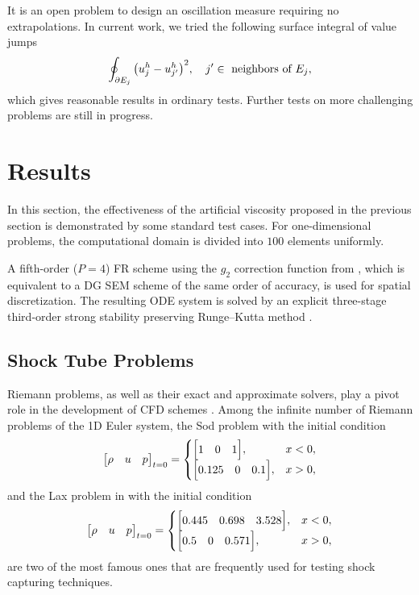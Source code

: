 \documentclass[10pt]{article}
\begin{document}
%
It is an open problem to design an oscillation measure requiring no extrapolations.
%
In current work, we tried the following surface integral of value jumps
$$
\oint_{\partial E_j} \qty(u^h_{j}-u^h_{j'})^2,\quad
j'\in\text{ neighbors of } E_j,
$$
which gives reasonable results in ordinary tests.
%
Further tests on more challenging problems are still in progress.

\section{Results}
In this section, the effectiveness of the artificial viscosity proposed in the previous section is demonstrated by some standard test cases.
%
For one-dimensional problems, the computational domain is divided into $100$ elements uniformly.
%

%
A fifth-order ($P=4$) FR scheme using the $g_2$ correction function from \cite{Huynh_2007}, which is equivalent to a DG SEM scheme of the same order of accuracy, is used for spatial discretization.
%
The resulting ODE system is solved by an explicit three-stage third-order strong stability preserving Runge--Kutta method \cite{Gottlieb_2001}.

\subsection{Shock Tube Problems}
Riemann problems, as well as their exact and approximate solvers, play a pivot role in the development of CFD schemes \cite{Toro_2009}.
Among the infinite number of Riemann problems of the 1D Euler system, the Sod problem with the initial condition
\begin{equation}
\mqty[\rho & u & p]_{t=0}
=
\begin{cases}
\mqty[1 & 0 & 1], &x<0,\\
\mqty[0.125 & 0 & 0.1], &x>0,\\
\end{cases}
\end{equation}
and the Lax problem in with the initial condition
\begin{equation}
\mqty[\rho & u & p]_{t=0}
=
\begin{cases}
\mqty[0.445 & 0.698 & 3.528], &x<0,\\
\mqty[0.5 & 0 & 0.571], &x>0,\\
\end{cases}
\end{equation}
are two of the most famous ones that are frequently used for testing shock capturing techniques.
\end{document}
